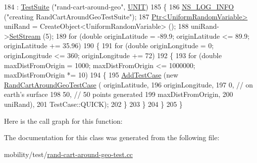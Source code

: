 \begin{DoxyCode}
184   : \hyperlink{classns3_1_1TestSuite_a904b0c40583b744d30908aeb94636d1a}{TestSuite} (\textcolor{stringliteral}{"rand-cart-around-geo"}, \hyperlink{classns3_1_1TestSuite_a1ebfcab34ec8161e085e8e3a1855eae0a3885375a3787abf60431f8454b3cadbd}{UNIT})
185 \{
186   \hyperlink{group__logging_gafbd73ee2cf9f26b319f49086d8e860fb}{NS\_LOG\_INFO} (\textcolor{stringliteral}{"creating RandCartAroundGeoTestSuite"});
187   \hyperlink{classns3_1_1Ptr}{Ptr<UniformRandomVariable>} uniRand = CreateObject<UniformRandomVariable> ();
188   uniRand->\hyperlink{classns3_1_1RandomVariableStream_add11aaf975607746b7e271d300659a94}{SetStream} (5);
189   \textcolor{keywordflow}{for} (\textcolor{keywordtype}{double} originLatitude = -89.9; originLatitude <= 89.9; originLatitude += 35.96)
190     \{
191       \textcolor{keywordflow}{for} (\textcolor{keywordtype}{double} originLongitude = 0; originLongitude <= 360; originLongitude += 72)
192         \{
193           \textcolor{keywordflow}{for} (\textcolor{keywordtype}{double} maxDistFromOrigin = 1000; maxDistFromOrigin <= 1000000; maxDistFromOrigin *= 10)
194             \{
195               \hyperlink{classns3_1_1TestCase_a3718088e3eefd5d6454569d2e0ddd835}{AddTestCase} (\textcolor{keyword}{new} \hyperlink{classRandCartAroundGeoTestCase}{RandCartAroundGeoTestCase} (
      originLatitude, 
196                                                           originLongitude, 
197                                                           0, \textcolor{comment}{// on earth's surface}
198                                                           50, \textcolor{comment}{// 50 points generated}
199                                                           maxDistFromOrigin,
200                                                           uniRand), 
201                            TestCase::QUICK);
202             \}
203         \}
204     \}
205 \}
\end{DoxyCode}


Here is the call graph for this function\+:




The documentation for this class was generated from the following file\+:\begin{DoxyCompactItemize}
\item 
mobility/test/\hyperlink{rand-cart-around-geo-test_8cc}{rand-\/cart-\/around-\/geo-\/test.\+cc}\end{DoxyCompactItemize}
